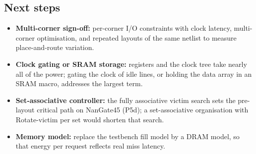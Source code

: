 \documentclass[11pt,a4paper]{article}
\begin{document}
\subsection{Next steps}
\begin{itemize}
\item \textbf{Multi-corner sign-off:} per-corner I/O constraints with clock latency, multi-corner optimisation, and
repeated layouts of the same netlist to measure place-and-route variation.
\item \textbf{Clock gating or SRAM storage:} registers and the clock tree take nearly all of the power; gating the
clock of idle lines, or holding the data array in an SRAM macro, addresses the largest term.
\item \textbf{Set-associative controller:} the fully associative victim search sets the pre-layout critical path
on NanGate45 (P5d); a set-associative organisation with Rotate-victim per set would shorten that search.
\item \textbf{Memory model:} replace the testbench fill model by a DRAM model, so that energy per request reflects
real miss latency.
\end{itemize}

\appendix
\end{document}
